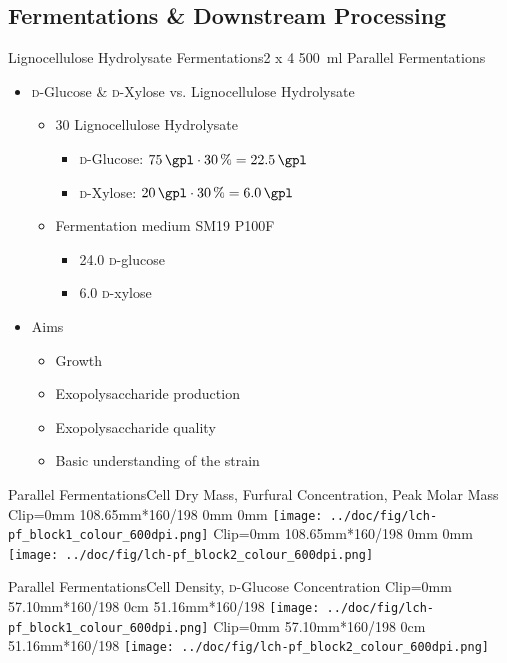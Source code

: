 \documentclass[mathserif]{beamer}
\newcommand{\SIpct}[1]{\SI{#1}{\percent}} %
\newcommand{\SIml}[1]{\SI{#1}{\ml}} %
\newcommand{\SIgpl}[1]{\SI{#1}{\gpl}} %
\newcommand{\LCH}{Lignocellulose Hydrolysate}
\newcommand{\FUR}{Furfural}
\newcommand{\EPS}{Exopolysaccharide}
\newcommand{\GLC}{\textsc{d}-Glu\-cose}
\newcommand{\glc}{\textsc{d}-glu\-cose}
\newcommand{\XYL}{\textsc{d}-Xy\-lose}
\newcommand{\xyl}{\textsc{d}-xy\-lose}
\begin{document}
\subsection{Fermentations \& Downstream Processing}

\begin{frame}{\LCH{} Fermentations}{2 x 4 \SIml{500} Parallel Fermentations}
	\begin{itemize}
		\item \GLC{} \& \XYL{} vs. \LCH{}
		\pause
			\begin{itemize}
				\item \SI{30}{\volpercent} \LCH{}
					\begin{itemize}
						\pause
						\item \GLC{}: $\SIgpl{75} \cdot \SIpct{30} = \SIgpl{22.5}$
						\item \XYL{}: $\SIgpl{20} \cdot \SIpct{30} = \SIgpl{6.0}$
					\end{itemize}
				\pause
				\item Fermentation medium SM19 P100F
					\begin{itemize}
						\pause
						\item \SIgpl{24.0} \glc{}
						\item \SIgpl{6.0} \xyl{}
					\end{itemize}
			\end{itemize}
		\pause
		\item Aims
			\begin{itemize}
				\item Growth
				\pause
				\item \EPS{} production
				\item \EPS{} quality
				\pause
				\item Basic understanding of the strain
			\end{itemize}
	\end{itemize}
\end{frame}

\begin{frame}{Parallel Fermentations}{Cell Dry Mass, \FUR{} Concentration, Peak Molar Mass}
	\adjustbox
	{
		Clip=0mm 108.65mm*160/198 0mm 0mm
	}{
		\texttt{[image: ../doc/fig/lch-pf\_block1\_colour\_600dpi.png]}
	}
	\hfill
	\adjustbox
	{
		Clip=0mm 108.65mm*160/198 0mm 0mm
	}{
		\texttt{[image: ../doc/fig/lch-pf\_block2\_colour\_600dpi.png]}
	}
\end{frame}

\begin{frame}{Parallel Fermentations}{Cell Density, \GLC{} Concentration}
	\adjustbox
	{
		Clip=0mm 57.10mm*160/198 0cm 51.16mm*160/198
	}{
		\texttt{[image: ../doc/fig/lch-pf\_block1\_colour\_600dpi.png]}
	}
	\hfill
	\adjustbox
	{
		Clip=0mm 57.10mm*160/198 0cm 51.16mm*160/198
	}{
		\texttt{[image: ../doc/fig/lch-pf\_block2\_colour\_600dpi.png]}
	}
\end{frame}
\end{document}
